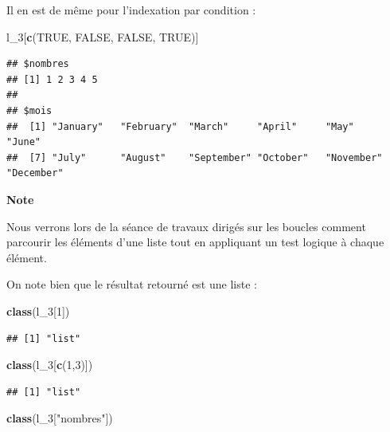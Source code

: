 \documentclass[
  11pt,
]{book}
\newenvironment{Shaded}{\begin{snugshade}}{\end{snugshade}}
\newcommand{\ConstantTok}[1]{\textcolor[rgb]{0.56,0.35,0.01}{#1}}
\newcommand{\DecValTok}[1]{\textcolor[rgb]{0.00,0.00,0.81}{#1}}
\newcommand{\FunctionTok}[1]{\textcolor[rgb]{0.13,0.29,0.53}{\textbf{#1}}}
\newcommand{\NormalTok}[1]{#1}
\newcommand{\StringTok}[1]{\textcolor[rgb]{0.31,0.60,0.02}{#1}}
\numberwithin{equation}{section}
\numberwithin{countremarque}{section}
\newenvironment{notebox}{
  \begin{tcolorbox}[breakable, colback=jaune,coltext=black,
                  colframe=grisfonce]}
 {\end{tcolorbox}}
\begin{document}
Il en est de même pour l'indexation par condition :

\begin{Shaded}
\begin{Highlighting}[]
\NormalTok{l\_3[}\FunctionTok{c}\NormalTok{(}\ConstantTok{TRUE}\NormalTok{, }\ConstantTok{FALSE}\NormalTok{, }\ConstantTok{FALSE}\NormalTok{, }\ConstantTok{TRUE}\NormalTok{)]}
\end{Highlighting}
\end{Shaded}

\begin{lstlisting}
## $nombres
## [1] 1 2 3 4 5
## 
## $mois
##  [1] "January"   "February"  "March"     "April"     "May"       "June"     
##  [7] "July"      "August"    "September" "October"   "November"  "December"
\end{lstlisting}

\begin{notebox}
\textbf{Note}

Nous verrons lors de la séance de travaux dirigés sur les boucles comment parcourir les éléments d'une liste tout en appliquant un test logique à chaque élément.

\end{notebox}

On note bien que le résultat retourné est une liste :

\begin{Shaded}
\begin{Highlighting}[]
\FunctionTok{class}\NormalTok{(l\_3[}\DecValTok{1}\NormalTok{])}
\end{Highlighting}
\end{Shaded}

\begin{lstlisting}
## [1] "list"
\end{lstlisting}

\begin{Shaded}
\begin{Highlighting}[]
\FunctionTok{class}\NormalTok{(l\_3[}\FunctionTok{c}\NormalTok{(}\DecValTok{1}\NormalTok{,}\DecValTok{3}\NormalTok{)])}
\end{Highlighting}
\end{Shaded}

\begin{lstlisting}
## [1] "list"
\end{lstlisting}

\begin{Shaded}
\begin{Highlighting}[]
\FunctionTok{class}\NormalTok{(l\_3[}\StringTok{"nombres"}\NormalTok{])}
\end{Highlighting}
\end{Shaded}
\end{document}
